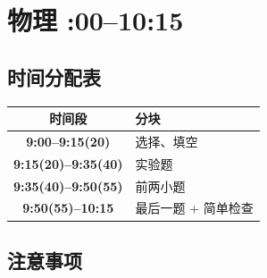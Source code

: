 \chapter{物理 :00--10:15}

\section{时间分配表}

\begin{center}
\begin{tabular}{@{} >{\bfseries}c l @{}}
    \toprule
    时间段 & 分块 \\
    \midrule
    9:00--9:15(20) & 选择、填空 \\
    9:15(20)--9:35(40) & 实验题 \\
    9:35(40)--9:50(55) & 前两小题 \\
    9:50(55)--10:15 & 最后一题 + 简单检查 \\
    \bottomrule
\end{tabular}
\end{center}

\section{注意事项}

